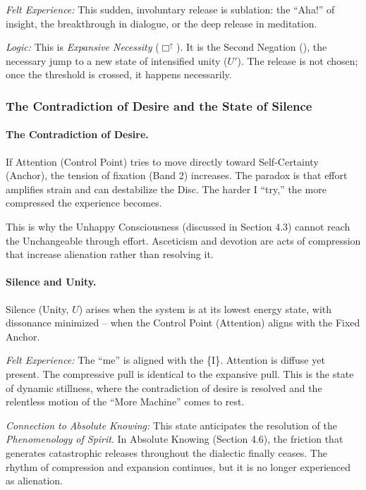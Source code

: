 \documentclass[12pt]{book}
\newcommand{\sublate}[1]{\cancel{#1}}
\begin{document}
\textit{Felt Experience:} This sudden, involuntary release is sublation: the ``Aha!'' of insight, the breakthrough in dialogue, or the deep release in meditation.

\textit{Logic:} This is \textit{Expansive Necessity} ($\Box^{\uparrow}$). It is the Second Negation (\sublate{no}), the necessary jump to a new state of intensified unity ($U'$). The release is not chosen; once the threshold is crossed, it happens necessarily.

\subsubsection{The Contradiction of Desire and the State of Silence}

\paragraph{The Contradiction of Desire.}

If Attention (Control Point) tries to move directly toward Self-Certainty (Anchor), the tension of fixation (Band 2) increases. The paradox is that effort amplifies strain and can destabilize the Disc. The harder I ``try,'' the more compressed the experience becomes.

This is why the Unhappy Consciousness (discussed in Section 4.3) cannot reach the Unchangeable through effort. Asceticism and devotion are acts of compression that increase alienation rather than resolving it.

\paragraph{Silence and Unity.}

Silence (Unity, $U$) arises when the system is at its lowest energy state, with dissonance minimized -- when the Control Point (Attention) aligns with the Fixed Anchor.

\textit{Felt Experience:} The ``me'' is aligned with the \{I\}. Attention is diffuse yet present. The compressive pull is identical to the expansive pull. This is the state of dynamic stillness, where the contradiction of desire is resolved and the relentless motion of the ``More Machine'' comes to rest.

\textit{Connection to Absolute Knowing:} This state anticipates the resolution of the \emph{Phenomenology of Spirit}. In Absolute Knowing (Section 4.6), the friction that generates catastrophic releases throughout the dialectic finally ceases. The rhythm of compression and expansion continues, but it is no longer experienced as alienation.
\end{document}
